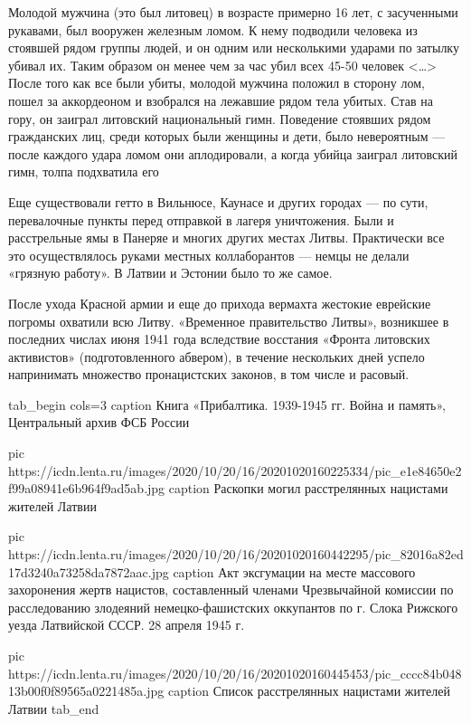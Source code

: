 \begin{fancyquote}
Молодой мужчина (это был литовец) в возрасте примерно 16 лет, с засученными
рукавами, был вооружен железным ломом. К нему подводили человека из стоявшей
рядом группы людей, и он одним или несколькими ударами по затылку убивал их.
Таким образом он менее чем за час убил всех 45-50 человек <…> После того как
все были убиты, молодой мужчина положил в сторону лом, пошел за аккордеоном и
взобрался на лежавшие рядом тела убитых. Став на гору, он заиграл литовский
национальный гимн. Поведение стоявших рядом гражданских лиц, среди которых были
женщины и дети, было невероятным — после каждого удара ломом они аплодировали,
а когда убийца заиграл литовский гимн, толпа подхватила его
\end{fancyquote}

Еще существовали гетто в Вильнюсе, Каунасе и других городах — по сути,
перевалочные пункты перед отправкой в лагеря уничтожения. Были и расстрельные
ямы в Панеряе и многих других местах Литвы. Практически все это осуществлялось
руками местных коллаборантов — немцы не делали «грязную работу». В Латвии и
Эстонии было то же самое.


После ухода Красной армии и еще до прихода вермахта жестокие еврейские погромы
охватили всю Литву. «Временное правительство Литвы», возникшее в последних
числах июня 1941 года вследствие восстания «Фронта литовских активистов»
(подготовленного абвером), в течение нескольких дней успело напринимать
множество пронацистских законов, в том числе и расовый.

\ifcmt
tab_begin cols=3
	caption Книга «Прибалтика. 1939-1945 гг. Война и память», Центральный архив ФСБ России

	pic https://icdn.lenta.ru/images/2020/10/20/16/20201020160225334/pic_e1e84650e2f99a08941e6b964f9ad5ab.jpg
	caption Раскопки могил расстрелянных нацистами жителей Латвии

	pic https://icdn.lenta.ru/images/2020/10/20/16/20201020160442295/pic_82016a82ed17d3240a73258da7872aac.jpg
	caption Акт эксгумации на месте массового захоронения жертв нацистов, составленный членами Чрезвычайной комиссии по расследованию злодеяний немецко-фашистских оккупантов по г. Слока Рижского уезда Латвийской СССР. 28 апреля 1945 г.

	pic https://icdn.lenta.ru/images/2020/10/20/16/20201020160445453/pic_cccc84b04813b00f0f89565a0221485a.jpg
	caption Список расстрелянных нацистами жителей Латвии
tab_end
\fi

